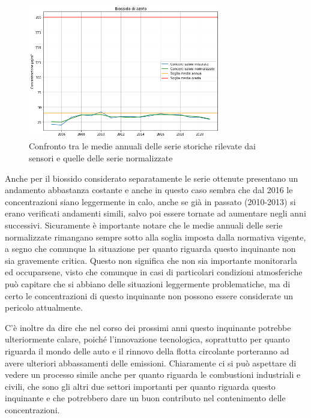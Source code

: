 \begin{figure}[h]
\centering
\includegraphics[width=0.75\textwidth]{no2_medie_annuali}
\caption{Confronto tra le medie annuali delle serie storiche rilevate dai sensori e quelle delle serie normalizzate}
\label{fig:no2_medie_annuali}
\end{figure}

Anche per il biossido considerato separatamente le serie ottenute presentano un andamento abbastanza costante e anche in questo caso sembra che dal 2016 le concentrazioni siano leggermente in calo, anche se già in passato (2010-2013) si erano verificati andamenti simili, salvo poi essere tornate ad aumentare negli anni successivi.
Sicuramente è importante notare che le medie annuali delle serie normalizzate rimangano sempre sotto alla soglia imposta dalla normativa vigente, a segno che comunque la situazione per quanto riguarda questo inquinante non sia gravemente critica. Questo non significa che non sia importante monitorarla ed occuparsene, visto che comunque in casi di particolari condizioni atmosferiche può capitare che si abbiano delle situazioni leggermente problematiche, ma di certo le concentrazioni di questo inquinante non possono essere considerate un pericolo attualmente.

C'è inoltre da dire che nel corso dei prossimi anni questo inquinante potrebbe ulteriormente calare, poiché l'innovazione tecnologica, soprattutto per quanto riguarda il mondo delle auto e il rinnovo della flotta circolante porteranno ad avere ulteriori abbassamenti delle emissioni. Chiaramente ci si può aspettare di vedere un processo simile anche per quanto riguarda le combustioni industriali e civili, che sono gli altri due settori importanti per quanto riguarda questo inquinante e che potrebbero dare un buon contributo nel contenimento delle concentrazioni.



